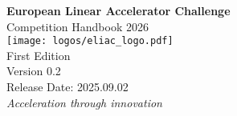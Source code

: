 
\begin{titlepage}
    \centering
    \vspace*{2cm}
    {\Huge\bfseries European Linear Accelerator Challenge\\[0.5cm]}
    {\LARGE Competition Handbook 2026\\[2cm]}
    \texttt{[image: logos/eliac\_logo.pdf]}\\[2cm]
    {\Large First Edition\\[2cm]}
    {\Large Version 0.2\\[0.5cm]}
    {\large Release Date: 2025.09.02\\[2cm]}
    \vfill
    {\large\textit{Acceleration through innovation}}\\[1cm]
\end{titlepage}